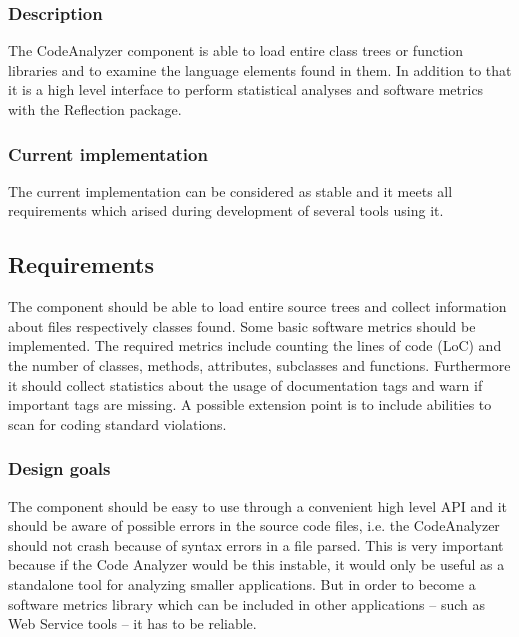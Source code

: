 \documentclass[10pt,final,a4paper,oneside]{article}
\begin{document}
\subsubsection{Description}
The CodeAnalyzer component is able to load entire class trees
or function libraries
and to examine the language elements found in them.
In addition to that it is a high level interface to
perform statistical analyses and software metrics with
the Reflection package.

\subsubsection{Current implementation}
The current implementation can be considered as stable
and it meets all requirements which arised during
development of several tools using it.

\subsection{Requirements}\label{subsec:CodeAnalyzerRequirements}
The component should be able to load entire source trees
and collect information about files respectively classes found.
Some basic software metrics should be implemented.
The required metrics include
counting the lines of code (LoC) and the number of
classes, methods, attributes, subclasses and functions.
Furthermore it should collect statistics
about the usage of documentation tags
and warn if important tags are missing.
A possible extension point is to include abilities
to scan for coding standard violations.

\subsubsection{Design goals}
The component should be easy to use through a convenient high level API
and it should be aware of possible errors in the source code files, i.e.
the CodeAnalyzer should not crash because of syntax errors in a file parsed.
This is very important because if the Code Analyzer would be this instable,
it would only be useful as a standalone tool for analyzing
smaller applications. But in order to become a software metrics library
which can be included in other applications -- such as Web Service tools --
it has to be reliable.


\end{document}
